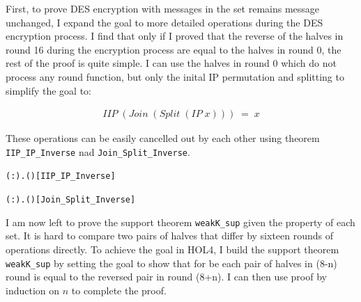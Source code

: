 \documentclass{article}
\begin{document}
First, to prove DES encryption with messages in the set remains message unchanged, I expand the goal to more detailed operations
during the DES encryption process. I find that only
if I proved that the reverse of the halves in round 16 during the encryption process are equal to the halves in round 0,
the rest of the proof is
quite simple. I can use the halves in round 0 which do not process any round function, but only the inital IP permutation
and splitting to simplify the goal to:

\begin{equation*}
\begin{split}
 IIP \; (Join \; (Split \; (IP \; x))) \; = \; x
\end{split}
\end{equation*}

These operations can be easily cancelled out by each other using theorem \verb|IIP_IP_Inverse| nad \verb|Join_Split_Inverse|.

\begin{alltt}
\HOLTokenTurnstile{} \HOLSymConst{\HOLTokenForall{}}( :).  ( ) \HOLSymConst{=} \hfill{[IIP_IP_Inverse]}
\end{alltt}

\begin{alltt}
\HOLTokenTurnstile{} \HOLSymConst{\HOLTokenForall{}}( :).  ( ) \HOLSymConst{=} \hfill{[Join_Split_Inverse]}
\end{alltt}

I am now left to prove the support theorem \verb|weakK_sup| given the property of each set. It is hard to compare two pairs of
halves that differ by sixteen rounds of operations directly. To achieve the goal in HOL4, I build the support theorem
\verb|weakK_sup| by setting the goal to show that for be each pair of halves in (8-n) round is equal to the reversed pair
in round (8+n). I can then use proof by induction on $n$ to complete the proof.
\end{document}
